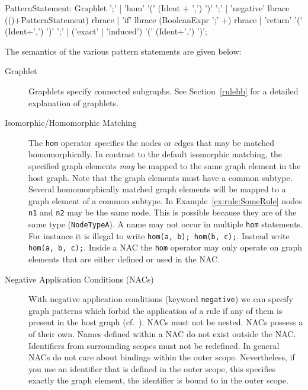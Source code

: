 \begin{rail}  
  PatternStatement: 
    Graphlet ';' |
    'hom' '(' (Ident + ',') ')' ';' |
    'negative' lbrace (()+PatternStatement) rbrace |
    'if' lbrace (BooleanExpr ';' +) rbrace |
    'return' '(' (Ident+',') ')' ';' |
    ('exact' | 'induced') '(' (Ident+',') ')';
\end{rail}
The semantics of the various pattern statements are given below:
\begin{description}
  \item[Graphlet] Graphlets specify connected subgraphs. See Section~\ref{rulebb} for a detailed explanation of graphlets.
  \item[Isomorphic/Homomorphic Matching] The \texttt{hom} operator specifies the nodes or edges that may be matched homomorphically. 
  In contrast to the default isomorphic matching, the specified graph elements \emph{may} be mapped to the same graph element in the host graph. Note that the graph elements must have a common subtype. 
  Several homomorphically matched graph elements will be mapped to a graph element of a common subtype.
  In Example~\ref{ex:rule:SomeRule} nodes \texttt{n1} and \texttt{n2} may be the same node. This is possible because they are of the same type (\texttt{NodeTypeA}).
  A name may not occur in multiple \texttt{hom} statements. 
  For instance it is illegal to write \texttt{hom(a, b); hom(b, c);}. Instead write \texttt{hom(a, b, c);}. 
  Inside a NAC the \texttt{hom} operator may only operate on graph elements that are either defined or used in the NAC.
  \item[Negative Application Conditions (NACs)] With negative application conditions (keyword \texttt{negative}) we can specify graph patterns which forbid the application of a rule if any of them is present in the host graph (cf.~\cite{adam}). 
  NACs must not be nested.
  NACs possess a  of their own. 
  Names defined within a NAC do not exist outside the NAC. 
  Identifiers from surrounding scopes must not be redefined.
  In general NACs do not care about bindings within the outer scope. 
  Nevertheless, if you use an identifier that is defined in the outer scope, this specifies exactly the graph element, the identifier is bound to in the outer scope.
  \begin{example}

\end{example}
\end{description}
